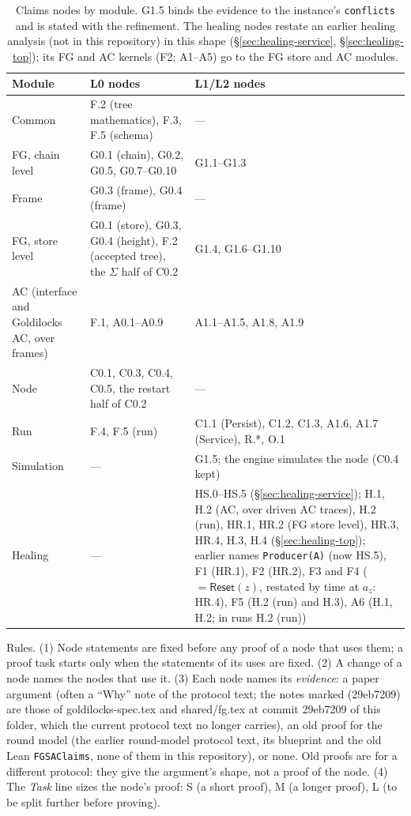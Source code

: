 \documentclass{article}
\begin{document}
\begin{table}[!ht]
\centering\footnotesize
\begin{tabular}{@{}>{\raggedright\arraybackslash}p{3.3cm}>{\raggedright\arraybackslash}p{5.2cm}>{\raggedright\arraybackslash}p{4.6cm}@{}}
\hline
Module & L0 nodes & L1/L2 nodes\\
\hline
Common & F.2 (tree mathematics), F.3, F.5 (schema) & ---\\
FG, chain level & G0.1 (chain), G0.2, G0.5, G0.7--G0.10 & G1.1--G1.3\\
Frame & G0.3 (frame), G0.4 (frame) & ---\\
FG, store level & G0.1 (store), G0.3, G0.4 (height), F.2 (accepted tree), the $\Sigma$ half of C0.2 & G1.4, G1.6--G1.10\\
AC (interface and Goldilocks AC, over frames) & F.1, A0.1--A0.9 & A1.1--A1.5, A1.8, A1.9\\
Node & C0.1, C0.3, C0.4, C0.5, the restart half of C0.2 & ---\\
Run & F.4, F.5 (run) & C1.1 (Persist), C1.2, C1.3, A1.6, A1.7 (Service), R.*, O.1\\
Simulation & --- & G1.5; the engine simulates the node (C0.4 kept)\\
Healing & --- & HS.0--HS.5 (\S\ref{sec:healing-service}); H.1, H.2 (AC, over driven AC traces), H.2 (run), HR.1, HR.2 (FG store level), HR.3, HR.4, H.3, H.4 (\S\ref{sec:healing-top}); earlier names \texttt{Producer(A)} (now HS.5), F1 (HR.1), F2 (HR.2), F3 and F4 ($=\mathsf{Reset}(z)$, restated by time at $a_z$: HR.4), F5 (H.2 (run) and H.3), A6 (H.1, H.2; in runs H.2 (run))\\
\hline
\end{tabular}
\caption{Claims nodes by module.  G1.5 binds the evidence to the instance's
\texttt{conflicts} and is stated with the refinement.  The healing nodes
restate an earlier healing analysis (not in this repository) in this shape
(\S\ref{sec:healing-service}, \S\ref{sec:healing-top}); its FG and AC kernels (F2; A1--A5) go to the FG store
and AC modules.}
\label{tab:modules}
\end{table}
Rules.  (1) Node statements are fixed before any proof of a node that uses
them; a proof task starts only when the statements of its uses are fixed.
(2) A change of a node names the nodes that use it.
(3) Each node names its \emph{evidence}: a paper argument (often a ``Why''
note of the protocol text; the notes marked (29eb7209) are those of
goldilocks-spec.tex and shared/fg.tex at commit 29eb7209 of this folder,
which the current protocol text no longer carries), an old proof for the round model
(the earlier round-model protocol text, its blueprint and the old Lean
\texttt{FGSAClaims}, none of them in this repository), or
none.  Old proofs are for a different protocol: they give the argument's shape,
not a proof of the node.  (4) The \emph{Task} line sizes the node's proof: S (a short
proof), M (a longer proof), L (to be split further before
proving).
\end{document}
